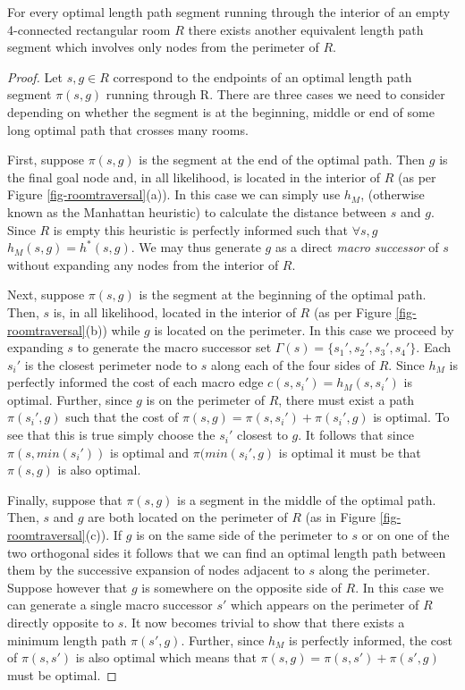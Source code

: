 \begin{lemma}
\label{thm-roomtraversal}
For every optimal length path segment running through the interior of an empty 
4-connected rectangular room $R$ there exists another equivalent length path 
segment which involves only nodes from the perimeter of $R$.
\end{lemma}
\begin{proof}
Let $s, g \in R$ correspond to the endpoints of an optimal length path segment 
$\pi(s, g)$ running through R.
There are three cases we need to consider depending on whether the segment 
is at the beginning, middle or end of some long optimal path that crosses
many rooms.
\par
First, suppose $\pi(s, g)$ is the segment at the end of the optimal path.
Then $g$ is the final goal node and, in all likelihood, is located in the 
interior of $R$ (as per Figure \ref{fig-roomtraversal}(a)).
In this case we can simply use $h_{M}$, (otherwise known as the Manhattan heuristic) 
to calculate the distance between $s$ and $g$.
Since $R$ is empty this heuristic is perfectly informed such that 
$\forall s, g$ $h_{M}(s, g) = h^*(s, g)$.
We may thus generate $g$ as a direct \emph{macro successor} of $s$ without expanding 
any nodes from the interior of $R$.
\par
Next, suppose $\pi(s, g)$ is the segment at the beginning of the optimal path. 
Then, $s$ is, in all likelihood, located in the interior of $R$ 
(as per Figure \ref{fig-roomtraversal}(b)) while $g$ is located on the perimeter.
In this case we proceed by expanding $s$ to generate the macro successor set 
$\Gamma(s) = \lbrace s_{1}', s_{2}', s_{3}', s_{4}'\rbrace$.
Each $s_{i}'$ is the closest perimeter node to $s$ along each of the four sides of $R$.
Since $h_{M}$ is perfectly informed the cost of each macro edge 
$c(s, s_{i}') = h_{M}(s, s_{i}')$ is optimal.
Further, since $g$ is on the perimeter of $R$, there must exist a path $\pi(s_{i}', g)$ 
such that the cost of $\pi(s, g) = \pi(s, s_{i}') + \pi(s_{i}', g)$ is optimal.
To see that this is true simply choose the $s_{i}'$ closest to $g$.
It follows that since $\pi(s, min(s_{i}'))$ is optimal and $\pi(min(s_{i}', g)$
is optimal it must be that $\pi(s, g)$ is also optimal. 
\par
Finally, suppose that $\pi(s, g)$ is a segment in the middle of the optimal path.
Then, $s$ and $g$ are both located on the perimeter of $R$ 
(as in Figure \ref{fig-roomtraversal}(c)). 
If $g$ is on the same side of the perimeter to $s$ or on one of the two orthogonal sides 
it follows that we can find an optimal length path between them by the successive expansion of 
nodes adjacent to $s$ along the perimeter.
Suppose however that $g$ is somewhere on the opposite side of $R$.
In this case we can generate a single macro successor $s'$ which appears on the 
perimeter of $R$ directly opposite to $s$.
It now becomes trivial to show that there exists a minimum length path $\pi(s',g)$.
Further, since $h_{M}$ is perfectly informed, the cost of $\pi(s, s')$ is also optimal
which means that $\pi(s, g) = \pi(s, s') + \pi(s', g)$ must be optimal.
\end{proof}

